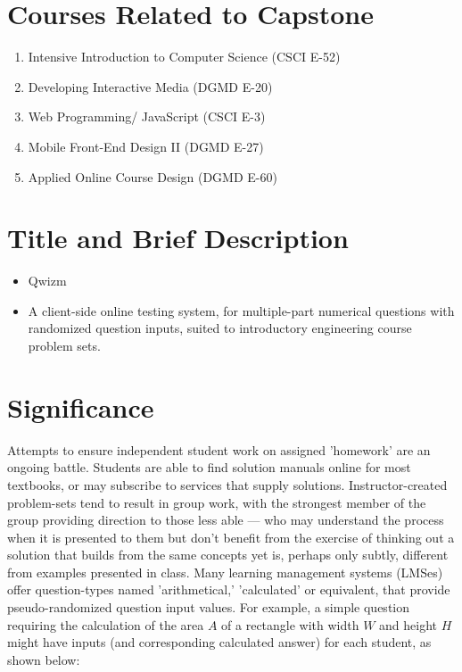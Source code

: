 \documentclass{tufte-handout}
\begin{document}
\section{\Large Courses Related to Capstone}\label{sec:project}
\begin{enumerate}
  \item Intensive Introduction to Computer Science (CSCI E-52)
	\item Developing Interactive Media (DGMD E-20)
  \item Web Programming/ JavaScript (CSCI E-3)
  \item Mobile Front-End Design II (DGMD E-27)
  \item Applied Online Course Design (DGMD E-60)
\end{enumerate}

\section{\Large Title and Brief Description}
\begin{itemize}
	\item Qwizm
	\item A client-side online testing system, for multiple-part numerical questions with randomized question inputs, suited to introductory engineering course problem sets.
\end{itemize}

\section{\Large Significance}

Attempts to ensure independent student work on assigned 'homework' are an ongoing battle. Students are able to find solution manuals online for most textbooks, or may subscribe to services that supply solutions. Instructor-created problem-sets tend to result in group work, with the strongest member of the group providing direction to those less able --- who may understand the process when it is presented to them but don't benefit from the exercise of thinking out a solution that builds from the same concepts yet is, perhaps only subtly, different from examples presented in class.
\parm
Many learning management systems (LMSes) offer question-types named 'arithmetical,' 'calculated' or equivalent, that provide pseudo-randomized question input values. For example, a simple question requiring the calculation of the area $A$ of a rectangle with width $W$ and height $H$ might have inputs (and corresponding calculated answer) for each student, as shown below:
\end{document}
